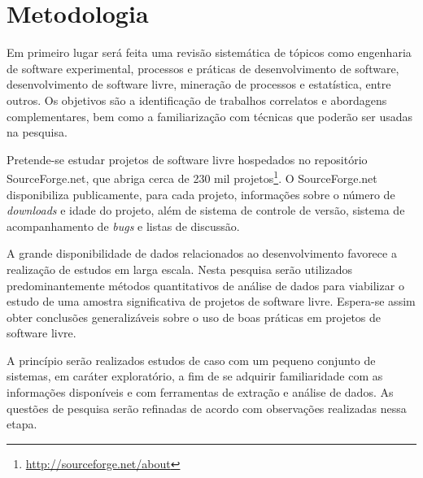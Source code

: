 \documentclass{article}
\begin{document}

\section{Metodologia}



Em primeiro lugar será feita uma revisão sistemática de tópicos como engenharia
de software experimental, processos e práticas de desenvolvimento de software,
desenvolvimento de software livre, mineração de processos e estatística, entre
outros. Os objetivos são a identificação de trabalhos correlatos e abordagens
complementares, bem como a familiarização com técnicas que poderão ser usadas na
pesquisa.

Pretende-se estudar projetos de software livre hospedados no repositório
SourceForge.net, que abriga cerca de 230 mil
projetos\footnote{\url{http://sourceforge.net/about}}. O SourceForge.net
disponibiliza publicamente, para cada projeto, informações sobre o número de
\emph{downloads} e idade do projeto, além de sistema de controle de versão,
sistema de acompanhamento de \emph{bugs} e listas de discussão. 

A grande disponibilidade de dados relacionados ao desenvolvimento favorece a
realização de estudos em larga escala. Nesta pesquisa serão utilizados
predominantemente métodos quantitativos de análise de dados para viabilizar o
estudo de uma amostra significativa de projetos de software livre. Espera-se
assim obter conclusões generalizáveis sobre o uso de boas práticas em projetos
de software livre.

A princípio serão realizados estudos de caso com um pequeno conjunto de
sistemas, em caráter exploratório, a fim de se adquirir familiaridade com as
informações disponíveis e com ferramentas de extração e análise de dados. As
questões de pesquisa serão refinadas de acordo com observações realizadas nessa
etapa.
\end{document}
